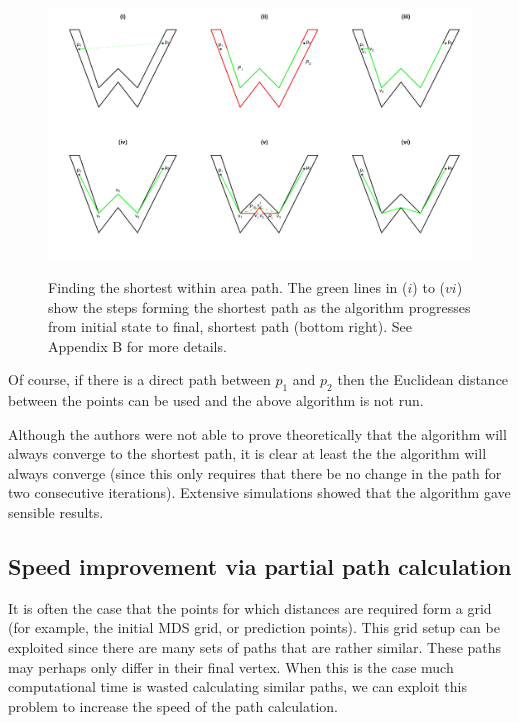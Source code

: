 \documentclass[useAMS, referee]{biom}
\begin{document}
\begin{figure}
\includegraphics[angle=90, height=\textheight,trim=0in 0.5in 0in 0.25in]{figs/wdia.pdf} \\
\label{wdia}
\caption{Finding the shortest within area path. The green lines in ($i$) to ($vi$) show the steps forming the shortest path as the algorithm progresses from initial state to final, shortest path (bottom right). See Appendix B for more details.}
\end{figure}




Of course, if there is a direct path between $p_1$ and $p_2$ then the Euclidean distance between the points can be used and the above algorithm is not run.

Although the authors were not able to prove theoretically that the algorithm will always converge to the shortest path, it is clear at least the the algorithm will always converge (since this only requires that there be no change in the path for two consecutive iterations). Extensive simulations showed that the algorithm gave sensible results.


\subsection*{Speed improvement via partial path calculation}

It is often the case that the points for which distances are required form a grid (for example, the initial MDS grid, or prediction points). This grid setup can be exploited since there are many sets of paths that are rather similar. These paths may perhaps only differ in their final vertex. When this is the case much computational time is wasted calculating similar paths, we can exploit this problem to increase the speed of the path calculation.
\end{document}
